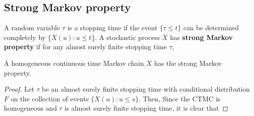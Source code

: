 \documentclass[a4paper,10pt,english]{article}
\begin{document}
\subsection{Strong Markov property}
A random variable $\tau$ is a stopping time if the event $\{\tau \leq t\}$ can be determined completely by $\{X(u): u \leqslant t\}$. 
A stochastic process $X$ has \textbf{strong Markov property} if for any almost surely finite stopping time $\tau$, 
\begin{lem}
\label{Lemma:StrongMarkovProperty}
A homogeneous continuous time Markov chain $X$ has the strong Markov property. 
\end{lem}
\begin{proof}
Let $\tau$ be an almost surely finite stopping time with conditional distribution $F$ on the collection of events $\{X(u): u \leq s\}$. 
Then, 
Since the CTMC is homogeneous and $\tau$ is almost surely finite stopping time, it is clear that 
\end{proof}
\end{document}
